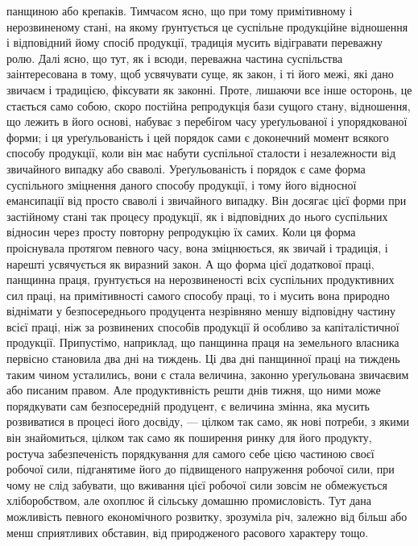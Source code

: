 \parcont{}  %
панщиною або крепаків. Тимчасом ясно, що при тому примітивному і нерозвиненому
стані, на якому ґрунтується це суспільне продукційне відношення і
відповідний йому спосіб продукції, традиція мусить відігравати переважну ролю.
Далі ясно, що тут, як і всюди, переважна частина суспільства заінтересована
в тому, щоб усвячувати суще, як закон, і ті його межі, які дано звичаєм і
традицією, фіксувати як законні. Проте, лишаючи все інше осторонь, це стається
само собою, скоро постійна репродукція бази сущого стану, відношення,
що лежить в його основі, набуває з перебігом часу уреґульованої і упорядкованої
форми; і ця уреґульованість і цей порядок сами є доконечний момент всякого
способу продукції, коли він має набути суспільної сталости і незалежности від
звичайного випадку або сваволі. Уреґульованість і порядок є саме форма суспільного
зміцнення даного способу продукції, і тому його відносної емансипації
від просто сваволі і звичайного випадку. Він досягає цієї форми при застійному
стані так процесу продукції, як і відповідних до нього суспільних відносин
через просту повторну репродукцію їх самих. Коли ця форма проіснувала протягом
певного часу, вона зміцнюється, як звичай і традиція, і нарешті усвячується
як виразний закон. А що форма цієї додаткової праці, панщинна праця,
ґрунтується на нерозвиненості всіх суспільних продуктивних сил праці, на
примітивності самого способу праці, то і мусить вона природно віднімати у
безпосереднього продуцента незрівняно меншу відповідну частину всієї праці,
ніж за розвинених способів продукції й особливо за капіталістичної продукції.
Припустімо, наприклад, що панщинна праця на земельного власника первісно становила
два дні на тиждень. Ці два дні панщинної праці на тиждень таким чином
усталились, вони є стала величина, законно уреґульована звичаєвим або писаним
правом. Але продуктивність решти днів тижня, що ними може порядкувати
сам безпосередній продуцент, є величина змінна, яка мусить розвиватися в
процесі його досвіду, — цілком так само, як нові потреби, з якими він знайомиться,
цілком так само як поширення ринку для його продукту, ростуча забезпеченість
порядкування для самого себе цією частиною своєї робочої сили,
підганятиме його до підвищеного напруження робочої сили, при чому не слід
забувати, що вживання цієї робочої сили зовсім не обмежується хліборобством,
але охоплює й сільську домашню промисловість. Тут дана можливість певного
економічного розвитку, зрозуміла річ, залежно від більш або менш сприятливих
обставин, від природженого расового характеру тощо.

